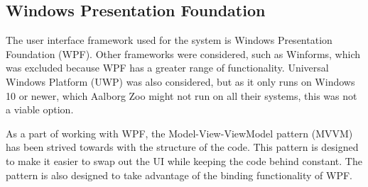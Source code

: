 \subsection{Windows Presentation Foundation} \label{ssc:tech_wpf}
The user interface framework used for the system is Windows Presentation Foundation (WPF). Other frameworks were considered, such as Winforms, which was excluded because WPF has a greater range of functionality. Universal Windows Platform (UWP) was also considered, but as it only runs on Windows 10 or newer, which Aalborg Zoo might not run on all their systems, this was not a viable option.
\par
As a part of working with WPF, the Model-View-ViewModel pattern (MVVM) has been strived towards with the structure of the code. This pattern is designed to make it easier to swap out the UI while keeping the code behind constant. The pattern is also designed to take advantage of the binding functionality of WPF.